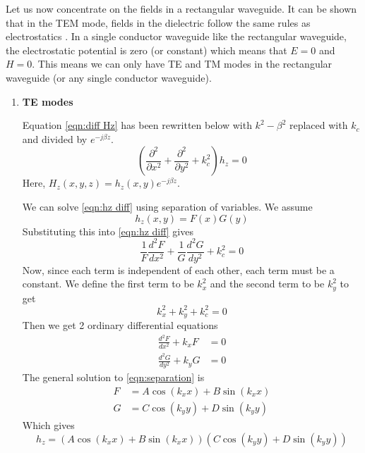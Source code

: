 Let us now concentrate on the fields in a rectangular waveguide. It can be shown that in the TEM mode, fields in the dielectric follow the same rules as electrostatics \cite{Pozar2009}. In a single conductor waveguide like the rectangular waveguide, the electrostatic potential is zero (or constant) which means that $E=0$ and $H=0$. This means we can only have TE and TM modes in the rectangular waveguide (or any single conductor waveguide).

\begin{enumerate}
\item \textbf{TE modes}

Equation \ref{eqn:diff Hz} has been rewritten below with $k^2-\beta^2$ replaced with $k_c$ and divided by $e^{-j\beta z}$.
\begin{equation}
\left(\frac{\partial^2}{\partial x^2}+\frac{\partial^2}{\partial y^2}+k_c^2\right)h_z=0
\label{eqn:hz diff}
\end{equation}
Here, $H_z(x,y,z)=h_z(x,y)e^{-j\beta z}$.

We can solve \ref{eqn:hz diff} using separation of variables. We assume
\begin{equation}
h_z(x,y)=F(x)G(y)
\end{equation}
Substituting this into \ref{eqn:hz diff} gives
\begin{equation}
\frac{1}{F}\frac{d^2F}{dx^2}+\frac{1}{G}\frac{d^2G}{dy^2}+k_c^2=0
\end{equation}
Now, since each term is independent of each other, each term must be a constant. We define the first term to be $k_x^2$ and the second term to be $k_y^2$ to get 
\begin{equation}
k_x^2+k_y^2+k_c^2=0
\end{equation}
Then we get 2 ordinary differential equations
\begin{subequations}
\label{eqn:separation}
\begin{align}
\frac{d^2F}{dx^2}+k_xF& =0\\
\frac{d^2G}{dy^2}+k_yG& =0
\end{align}
\end{subequations}
The general solution to \ref{eqn:separation} is
\begin{subequations}
\begin{align}
F& =A\cos(k_xx)+B\sin(k_xx)\\
G& =C\cos(k_yy)+D\sin(k_yy)
\end{align}
\end{subequations}
Which gives
\begin{equation}
h_z =(A\cos(k_xx)+B\sin(k_xx))(C\cos(k_yy)+D\sin(k_yy))
\label{eqn:hz general}
\end{equation}


\end{enumerate}
